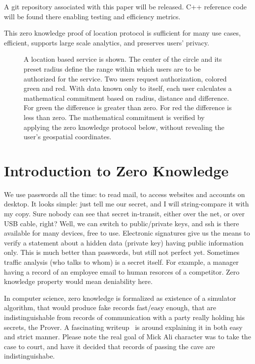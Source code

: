 \documentclass{article}
\begin{document}
A git repository associated with this paper will be released. C++ reference code will be found there enabling testing and efficiency metrics. 

This zero knowledge proof of location protocol is sufficient for many use cases, efficient, supports large scale analytics, and preserves users' privacy.

\begin{figure}
  \centering
  \def\svgwidth{\columnwidth}
  
\caption{A location based service is shown.
The center of the circle and its preset radius define the range within which users are to be authorized for the service.
Two users request authorization, colored green and red.
With data known only to itself, each user calculates a mathematical commitment based on radius, distance and difference.
For green the difference is greater than zero.
For red the difference is less than zero.
The mathematical commitment is verified by applying the zero knowledge protocol below, without revealing the user's geospatial coordinates.}
\label{fig-rangeproof}
\end{figure}

\section{Introduction to Zero Knowledge}

We use passwords all the time: to read mail, to access websites and accounts on desktop.
It looks simple: just tell me our secret, and I will string-compare it with my copy.
Sure nobody can see that secret in-transit, either over the net, or over USB cable, right?
Well, we can switch to public/private keys, and ssh is there available for many devices, free to use.
Electronic signatures give us the means to verify a statement about a hidden data (private key)
having public information only. %
This is much better than passwords, but still not perfect yet.
Sometimes traffic analysis (who talks to whom) is a secret itself.
For example, a manager having a record of an employee email to human resorces of a competitor.
Zero knowledge property would mean deniability here.

In computer science, zero knowledge is formalized as existence of a simulator algorithm,
that would produce fake records fast/easy enough,
that are indistinguishable from records of communication with a party really holding his secrets, the Prover.
A fascinating writeup~\cite{Quisquater89} is around explaining it in both easy and strict manner.
Please note the real goal of Mick Ali character was to take the case to court,
and have it decided that records of passing the cave are indistinguishabe.
\end{document}
